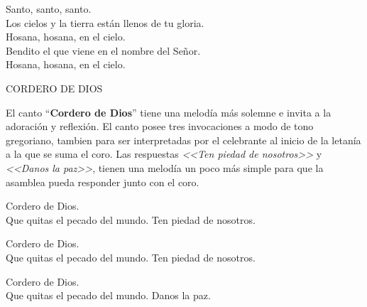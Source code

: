 \documentclass[12pt, letterpaper]{report}
\begin{document}
    \noindent
    Santo, santo, santo. \\
    Los cielos y la tierra est\'an llenos de tu gloria.\\
    Hosana, hosana, en el cielo.\\
    Bendito el que viene en el nombre del Se\~nor. \\
    Hosana, hosana, en el cielo.
    \clearpage




    \begin{center}
      {\large CORDERO DE DIOS}
    \end{center}

    El canto ``\textbf{Cordero de Dios}'' tiene una melod\'ia m\'as solemne e invita a la adoraci\'on y reflexi\'on. El canto posee tres invocaciones a modo de tono gregoriano, tambien para ser interpretadas por el celebrante al inicio de la letan\'ia a la que se suma el coro. Las respuestas \textit{<<Ten piedad de nosotros>>} y \textit{<<Danos la paz>>}, tienen una melod\'ia un poco m\'as simple para que la asamblea pueda responder junto con el coro.

    \noindent
    Cordero de Dios.\\
    Que quitas el pecado del mundo. Ten piedad de nosotros.

    \noindent
    Cordero de Dios.\\
    Que quitas el pecado del mundo. Ten piedad de nosotros.

    \noindent
    Cordero de Dios.\\
    Que quitas el pecado del mundo. Danos la paz.
    \clearpage

\end{document}
